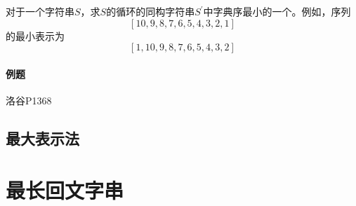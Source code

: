 对于一个字符串$S$，求$S$的循环的同构字符串$S^{'}$中字典序最小的一个。例如，序列
\[
  [10,9,8,7,6,5,4,3,2,1]
\]
的最小表示为
\[
  [1,10,9,8,7,6,5,4,3,2]
\]

\paragraph{例题} 洛谷P1368



\subsection{最大表示法}


\section{最长回文字串}

